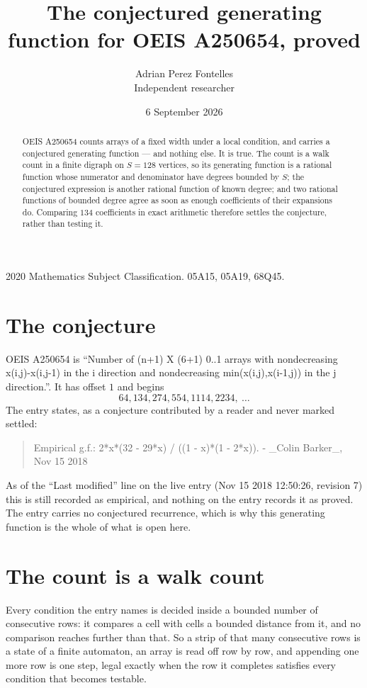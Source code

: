 \documentclass[11pt,a4paper]{article}
\title{The conjectured generating function for OEIS A250654, proved}
\author{Adrian Perez Fontelles\\ \small Independent researcher}
\date{6 September 2026}
\theoremstyle{plain}
\theoremstyle{definition}
\begin{document}
\maketitle

\begin{abstract}
OEIS A250654 counts arrays of a fixed width under a local condition, and carries a conjectured
generating function --- and nothing else. It is true. The count is a walk count in a finite
digraph on $S=128$ vertices, so its generating function is a rational function whose numerator
and denominator have degrees bounded by $S$; the conjectured expression is another rational
function of known degree; and two rational functions of bounded degree agree as soon as enough
coefficients of their expansions do. Comparing $134$ coefficients in exact arithmetic
therefore settles the conjecture, rather than testing it.
\end{abstract}

\noindent\small 2020 Mathematics Subject Classification. 05A15, 05A19, 68Q45.\normalsize

\section{The conjecture}

OEIS A250654 is ``Number of (n+1) X (6+1) 0..1 arrays with nondecreasing x(i,j)-x(i,j-1) in the i direction and nondecreasing min(x(i,j),x(i-1,j)) in the j direction.''. It has offset $1$ and begins
\[
64, 134, 274, 554, 1114, 2234,\ \dots
\]
The entry states, as a conjecture contributed by a reader and never marked settled:
\begin{quote}
Empirical g.f.: 2*x*(32 - 29*x) / ((1 - x)*(1 - 2*x)). - \_Colin Barker\_, Nov 15 2018
\end{quote}
As of the ``Last modified'' line on the live entry (Nov 15 2018 12:50:26, revision 7) this is still
recorded as empirical, and nothing on the entry records it as proved. The entry carries no
conjectured recurrence, which is why this generating function is the whole of what is open
here.

\section{The count is a walk count}

Every condition the entry names is decided inside a bounded number of consecutive rows: it
compares a cell with cells a bounded distance from it, and no comparison reaches further than
that. So a strip of that many consecutive rows is a state of a finite automaton, an array is
read off row by row, and appending one more row is one step, legal exactly when the row it
completes satisfies every condition that becomes testable.
\end{document}
